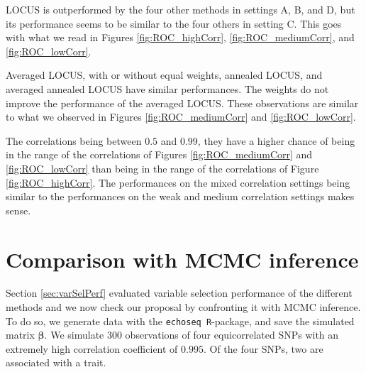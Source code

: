 \documentclass[a4paper, 11pt]{report}
\numberwithin{equation}{chapter}
\begin{document}
LOCUS is outperformed by the four other methods in settings A, B, and D, but its performance seems to be similar to the four others in setting C. This goes with what we read in Figures \ref{fig:ROC_highCorr}, \ref{fig:ROC_mediumCorr}, and \ref{fig:ROC_lowCorr}.

Averaged LOCUS, with or without equal weights, annealed LOCUS, and averaged annealed LOCUS have similar performances. The weights do not improve the performance of the averaged LOCUS. These observations are similar to what we observed in Figures \ref{fig:ROC_mediumCorr} and  \ref{fig:ROC_lowCorr}. 

The correlations being between $0.5$ and $0.99$, they have a higher chance of being in the range of the correlations of Figures \ref{fig:ROC_mediumCorr} and \ref{fig:ROC_lowCorr} than being in the range of the correlations of Figure \ref{fig:ROC_highCorr}. The performances on the mixed correlation settings being similar to the performances on the weak and medium correlation settings makes sense. 


\section{Comparison with MCMC inference} \label{sec:comparison}
Section \ref{sec:varSelPerf} evaluated variable selection performance of the different methods and we now check our proposal by confronting it with MCMC inference. To do so, we generate data with the \texttt{echoseq R}-package, and save the simulated matrix $\boldsymbol{\beta}$. We simulate $300$ observations of four equicorrelated SNPs with an extremely high correlation coefficient of $0.995$. Of the four SNPs, two are associated with a trait.
\end{document}

